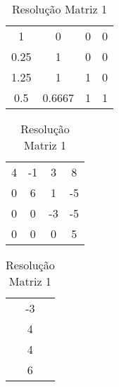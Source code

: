 \documentclass[12pt]{article}
\begin{document}
\begin{table}[!ht]
  \begin{minipage}[b]{.46\linewidth}

    \centering
    \begin{tabular}{|c c c|c|}
        1           &         0          &           0     &   0\\
        0.25           &         1          &           0     &   0\\
        1.25           &         1          &           1     &   0\\
        0.5           &         0.6667          &           1     &   1\\
    \end{tabular}
    \caption{Matriz LU 1}
    \label{tab:dir}

  \end{minipage}\hfill
  \begin{minipage}[b]{.46\linewidth}

    \centering
    \begin{tabular}{|c c c|c|}
        4           &         -1          &           3     &   8\\
        0           &         6          &           1     &   -5\\
        0           &         0          &           -3     &   -5\\
        0           &         0          &           0     &   5\\
    \end{tabular}
    \caption{Matriz U 1}
    \label{tab:esq}

  \end{minipage}\hfill
  \begin{minipage}[b]{.46\linewidth}

    \centering
    \begin{tabular}{|c|}
        -3\\
        4\\
        4\\
        6\\
    \end{tabular}
    \caption{Resolução Matriz 1}
    \label{tab:dir}
  \end{minipage}
\end{table}
\end{document}
